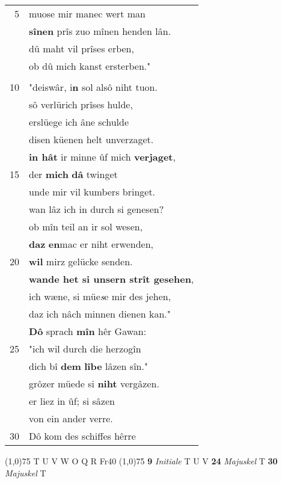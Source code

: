 \documentclass[8pt,a4paper,notitlepage]{article}
\begin{document}
\begin{table}[ht]
\begin{minipage}[t]{0.5\linewidth}
\begin{tabular}{rl}
5 & muose mir manec wert man\\ 
 & \textbf{sînen} prîs zuo mînen henden lân.\\ 
 & dû maht vil prîses erben,\\ 
 & ob dû mich kanst ersterben."\\ 
 & \textit{\begin{large}D\end{large}}ô dâhte \textbf{des} \textbf{küneges} Lotes suon:\\ 
10 & "deiswâr, i\textbf{n} sol alsô niht tuon.\\ 
 & sô verlürich prîses hulde,\\ 
 & erslüege ich âne schulde\\ 
 & disen küenen helt unverzaget.\\ 
 & \textbf{in hât} ir minne ûf mich \textbf{verjaget},\\ 
15 & der \textbf{mich} \textbf{dâ} twinget\\ 
 & unde mir vil kumbers bringet.\\ 
 & wan lâz ich in durch si genesen?\\ 
 & ob mîn teil an ir sol wesen,\\ 
 & \textbf{daz} \textbf{en}mac er niht erwenden,\\ 
20 & \textbf{wil} mirz gelücke senden.\\ 
 & \textbf{wande het si unsern strît gesehen},\\ 
 & ich wæne, si müe\textit{s}e mir des jehen,\\ 
 & daz ich nâch minnen dienen kan."\\ 
 & \textbf{Dô} sprach \textbf{mîn} hêr Gawan:\\ 
25 & "ich wil durch die herzogîn\\ 
 & dich bî \textbf{dem} \textbf{lîbe} lâzen sîn."\\ 
 & grôzer müede si \textbf{niht} vergâzen.\\ 
 & er liez in ûf; si sâzen\\ 
 & von ein ander verre.\\ 
30 & Dô kom des schiffes hêrre\\ 
\end{tabular}
\scriptsize
\line(1,0){75} \newline
T U V W O Q R Fr40 \newline
\line(1,0){75} \newline
\textbf{9} \textit{Initiale} T U V  \textbf{24} \textit{Majuskel} T  \textbf{30} \textit{Majuskel} T  \newline

\end{minipage}
\end{table}
\end{document}
